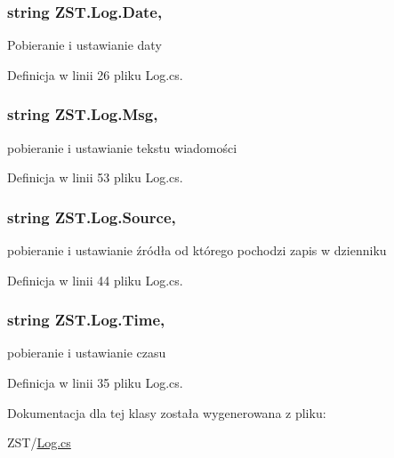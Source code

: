 \subsubsection[{Date}]{\setlength{\rightskip}{0pt plus 5cm}string Z\+S\+T.\+Log.\+Date\hspace{0.3cm}{\ttfamily [get]}, {\ttfamily [set]}}\label{class_z_s_t_1_1_log_a18e6ee60e833732b553f991aca086217}


Pobieranie i ustawianie daty 



Definicja w linii 26 pliku Log.\+cs.

\hypertarget{class_z_s_t_1_1_log_a66573e9f4fe9a03aa42c2106b23c7b69}{}
\subsubsection[{Msg}]{\setlength{\rightskip}{0pt plus 5cm}string Z\+S\+T.\+Log.\+Msg\hspace{0.3cm}{\ttfamily [get]}, {\ttfamily [set]}}\label{class_z_s_t_1_1_log_a66573e9f4fe9a03aa42c2106b23c7b69}


pobieranie i ustawianie tekstu wiadomości 



Definicja w linii 53 pliku Log.\+cs.

\hypertarget{class_z_s_t_1_1_log_a341d360d9362ea78c23dcfdde1ad3075}{}
\subsubsection[{Source}]{\setlength{\rightskip}{0pt plus 5cm}string Z\+S\+T.\+Log.\+Source\hspace{0.3cm}{\ttfamily [get]}, {\ttfamily [set]}}\label{class_z_s_t_1_1_log_a341d360d9362ea78c23dcfdde1ad3075}


pobieranie i ustawianie źródła od którego pochodzi zapis w dzienniku 



Definicja w linii 44 pliku Log.\+cs.

\hypertarget{class_z_s_t_1_1_log_a80ca6c06e14d09edc94cbd0c0e21b8ee}{}
\subsubsection[{Time}]{\setlength{\rightskip}{0pt plus 5cm}string Z\+S\+T.\+Log.\+Time\hspace{0.3cm}{\ttfamily [get]}, {\ttfamily [set]}}\label{class_z_s_t_1_1_log_a80ca6c06e14d09edc94cbd0c0e21b8ee}


pobieranie i ustawianie czasu 



Definicja w linii 35 pliku Log.\+cs.



Dokumentacja dla tej klasy została wygenerowana z pliku\+:\begin{DoxyCompactItemize}
\item 
Z\+S\+T/\hyperlink{_log_8cs}{Log.\+cs}\end{DoxyCompactItemize}
